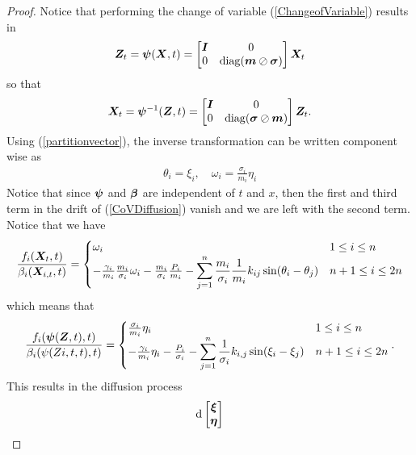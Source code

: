 \documentclass[11pt,twoside,a4paper]{article}
\begin{document}
\begin{proof}
Notice that performing the change of variable (\ref{ChangeofVariable})
results in 
\begin{align}
    {\bm{Z}}_t = {\bm{\psi}}({\bm{X}},t) = 
     \begin{bmatrix}
    {\bm{I}} & 0 \\ 
    0 & \operatorname{diag}({\bm{m}} \oslash {\bm{\sigma}} )
    \end{bmatrix} {\bm{X}}_t
\end{align}
so that 
\begin{align}
    {\bm{X}}_t = {\bm{\psi}}^{-1}({\bm{Z}},t) =
      \begin{bmatrix}
    {\bm{I}} & 0 \\ 
    0 & \operatorname{diag}({\bm{\sigma}} \oslash {\bm{m}} )
    \end{bmatrix}
    {\bm{Z}}_t.
\end{align}
Using (\ref{partitionvector}), the inverse transformation can be written component wise as 
\begin{align} \label{compontentwisetransform}
    \theta_i = \xi_i,\quad \omega_i = \frac{\sigma_i}{m_i}  \eta_i
\end{align}
Notice that since ${\bm{\psi}}$ and ${\bm{\beta}}$ are independent of $t$ and $x$, then the first and third term in the drift of (\ref{CoVDiffusion}) vanish and we are left with the second term. Notice that we have
\begin{align}
  \frac{f_i({\bm{X}}_t,t)}{\beta_i({\bm{X}}_{i,t},t)} = \begin{cases}
  \omega_i & 1\leq i \leq n \\ 
  -\frac{\gamma_i}{m_i}\frac{m_i}{\sigma_i} \omega_i -\frac{m_i}{\sigma_i}\frac{P_i}{m_i} - \displaystyle \sum_{j=1}^{n} \frac{m_i}{\sigma_i} \frac{1}{m_i}k_{ij} \sin(\theta_i-\theta_j) & n+1\leq i \leq 2n
  \end{cases}
\end{align}
which means that 
\begin{align}
    \frac{f_i({\bm{\psi}}({\bm{Z}},t),t)}{\beta_i(\psi(Z{i,t},t),t)} = \begin{cases}
    \frac{\sigma_i}{m_i} \eta _i & 1\leq i \leq n \\ 
    -\frac{\gamma_i}{m_i}\eta_i-\frac{P_i}{\sigma_i} -\displaystyle \sum_{j=1}^{n}\frac{1}{\sigma_i} k_{i,j}\sin(\xi_i-\xi_j) & n+1\leq i \leq 2n
    \end{cases}.
\end{align}
This results in the diffusion process 
\begin{align}
{\rm{d}} \begin{bmatrix}
 {\bm{\xi}} \\ {\bm{\eta}} 

\end{bmatrix}
\end{align}
\end{proof}
\end{document}
